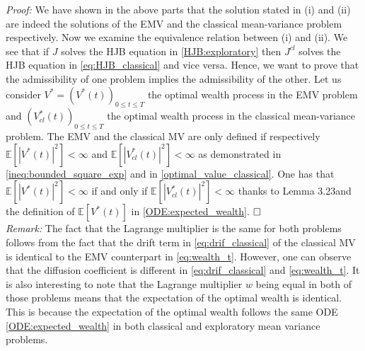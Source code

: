 \documentclass[oneside, a4paper, onecolumn, 11pt]{article}
\begin{document}
\textit{Proof:}
We have shown in the above parts that the solution stated in (i) and (ii) are indeed the solutions of the EMV and the classical mean-variance problem respectively. 
Now we examine the equivalence relation between (i) and (ii). We see that if $J$ solves the HJB equation in \eqref{HJB:exploratory} then $J^{cl}$ solves the HJB equation in \eqref{eq:HJB_classical} and vice versa. Hence, we want to prove that the admissibility of one problem implies the admissibility of the other. Let us consider $V^*= (V^*(t))_{0\leq t\leq T}$ the optimal wealth process in the EMV problem and $(V^*_{cl}(t))_{0\leq t \leq T}$ the optimal wealth process in the classical mean-variance problem. 
The EMV and the classical MV are only defined if respectively  $\mathbb{E}\left[|V^*(t)|^2\right] < \infty$ and $\mathbb{E}\left[|V^*_{cl}(t)|^2\right] < \infty$ as demonstrated in \eqref{ineq:bounded_square_exp} and in \eqref{optimal_value_classical}.
One has that $\mathbb{E}\left[|V^*(t)|^2\right] < \infty$ if and only if $\mathbb{E}\left[|V^*_{cl}(t)|^2\right] < \infty$ thanks to Lemma 3.23and the definition of $\mathbb{E}\left[V^*(t)\right]$ in \eqref{ODE:expected_wealth}. 
$\hfill \square$
\newline
\\ \textit{Remark:} The fact that the Lagrange multiplier is the same for both problems follows from the fact that the drift term in \eqref{eq:drif_classical} of the classical MV is identical to the EMV counterpart in \eqref{eq:wealth_t}. However, one can observe that the diffusion coefficient is different in \eqref{eq:drif_classical} and \eqref{eq:wealth_t}. 
It is also interesting to note that the Lagrange multiplier $w$ being equal in both of those problems means that the expectation of the optimal wealth is identical. This is because the expectation of the optimal wealth follows the same ODE \eqref{ODE:expected_wealth} in both classical and exploratory mean variance problems.
\end{document}
